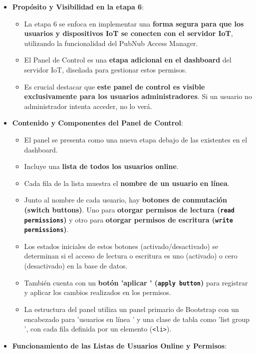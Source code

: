 \documentclass{report}
\begin{document}
\begin{itemize}
    \item \textbf{Propósito y Visibilidad en la etapa 6}:
    \begin{itemize}
        \item La etapa 6 se enfoca en implementar una \textbf{forma segura para que los usuarios y dispositivos IoT se conecten con el servidor IoT}, 
        utilizando la funcionalidad del PubNub Access Manager.
        \item El Panel de Control es una \textbf{etapa adicional en el dashboard} del servidor IoT, diseñada para gestionar estos permisos.
        \item Es crucial destacar que \textbf{este panel de control es visible exclusivamente para los usuarios administradores}. Si un usuario no 
        administrador intenta acceder, no lo verá.
    \end{itemize}
    \item \textbf{Contenido y Componentes del Panel de Control}:
    \begin{itemize}
        \item El panel se presenta como una nueva etapa debajo de las existentes en el dashboard.
        \item Incluye una \textbf{lista de todos los usuarios online}.
        \item Cada fila de la lista muestra el \textbf{nombre de un usuario en línea}.
        \item Junto al nombre de cada usuario, hay \textbf{botones de conmutación (switch buttons)}. Uno para \textbf{otorgar permisos de lectura 
        (\texttt{read permissions})} y otro para \textbf{otorgar permisos de escritura (\texttt{write permissions})}.
        \item Los estados iniciales de estos botones (activado/desactivado) se determinan si el acceso de lectura o escritura es uno (activado) o cero 
        (desactivado) en la base de datos.
        \item También cuenta con un \textbf{botón  'aplicar ' (\texttt{apply button})} para registrar y aplicar los cambios realizados en los permisos.
        \item La estructura del panel utiliza un panel primario de Bootstrap con un encabezado para  'usuarios en línea ' y una clase de tabla como  
        'list group ', con cada fila definida por un elemento (\texttt{<li>}).
    \end{itemize}
    \item \textbf{Funcionamiento de las Listas de Usuarios Online y Permisos}:

\end{itemize}
\end{document}
